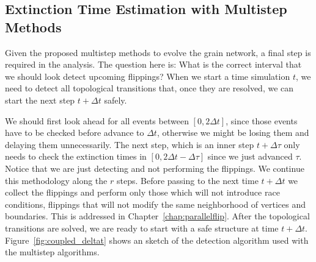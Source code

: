 \subsection{Extinction Time Estimation with Multistep Methods}

Given the proposed multistep methods to evolve the grain network, a final step is required in the analysis. The question here is: What is the correct interval that we should look detect upcoming flippings? When we start a time simulation $t$, we need to detect all topological transitions that, once they are resolved, we can start the next step $t+\Delta t$ safely.

We should first look ahead for all events between $[0, 2\Delta t]$, since those events have to be checked before advance to $\Delta t$, otherwise we might be losing them and delaying them unnecessarily. The next step, which is an inner step $t+\Delta \tau$ only needs to check the extinction times in $[0, 2\Delta t - \Delta \tau]$ since we just advanced $\tau$. Notice that we are just detecting and not performing the flippings. 
We continue this methodology along the $r$ steps. Before passing to the next time $t+\Delta t$ we collect the flippings and perform only those which will not introduce race conditions, \ie flippings that will not modify the same neighborhood of vertices and boundaries. 
This is addressed in Chapter~\ref{chap:parallelflip}. 
After the topological transitions are solved, we are ready to start with a safe structure at time $t+\Delta t$. 
Figure~\ref{fig:coupled_deltat} shows an sketch of the detection algorithm used with the multistep algorithms.

